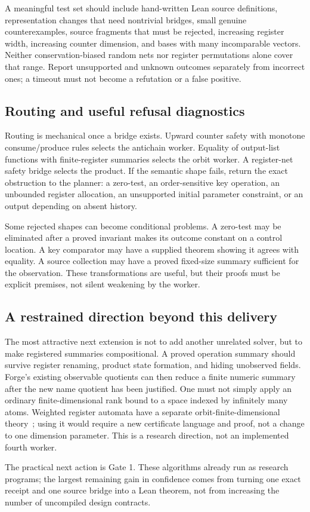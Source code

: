 A meaningful test set should include hand-written Lean source definitions,
representation changes that need nontrivial bridges, small genuine
counterexamples, source fragments that must be rejected, increasing register
width, increasing counter dimension, and bases with many incomparable vectors.
Neither conservation-biased random nets nor register permutations alone cover
that range. Report unsupported and unknown outcomes separately from incorrect
ones; a timeout must not become a refutation or a false positive.

\subsection{Routing and useful refusal diagnostics}
Routing is mechanical once a bridge exists. Upward counter safety with monotone
consume/produce rules selects the antichain worker. Equality of output-list
functions with finite-register summaries selects the orbit worker. A
register-net safety bridge selects the product. If the semantic shape fails,
return the exact obstruction to the planner: a zero-test, an order-sensitive
key operation, an unbounded register allocation, an unsupported initial
parameter constraint, or an output depending on absent history.

Some rejected shapes can become conditional problems. A zero-test may be
eliminated after a proved invariant makes its outcome constant on a control
location. A key comparator may have a supplied theorem showing it agrees with
equality. A source collection may have a proved fixed-size summary sufficient
for the observation. These transformations are useful, but their proofs must
be explicit premises, not silent weakening by the worker.

\subsection{A restrained direction beyond this delivery}
The most attractive next extension is not to add another unrelated solver, but
to make registered summaries compositional. A proved operation summary should
survive register renaming, product state formation, and hiding unobserved
fields. Forge's existing observable quotients can then reduce a finite numeric
summary after the new name quotient has been justified. One must not simply
apply an ordinary finite-dimensional rank bound to a space indexed by infinitely
many atoms. Weighted register automata have a separate orbit-finite-dimensional
theory~\cite{weighted}; using it would require a new certificate language and
proof, not a change to one dimension parameter. This is a research direction,
not an implemented fourth worker.

The practical next action is Gate 1. These algorithms already run as research
programs; the largest remaining gain in confidence comes from turning one exact
receipt and one source bridge into a Lean theorem, not from increasing the
number of uncompiled design contracts.
